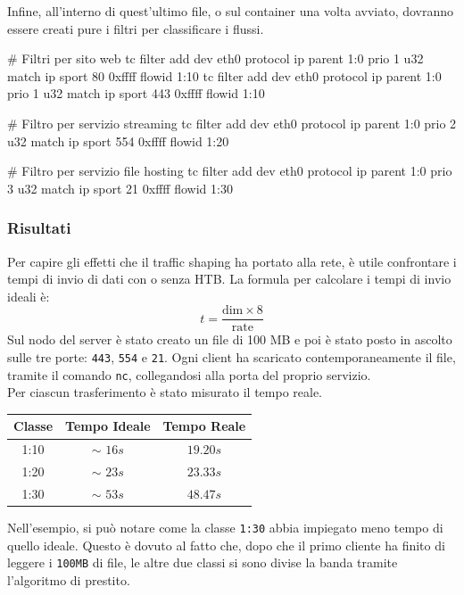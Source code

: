 Infine, all'interno di quest'ultimo file, o sul container una volta avviato, dovranno essere creati pure i filtri per classificare i flussi.
\begin{bash}
  # Filtri per sito web
  tc filter add dev eth0 protocol ip parent 1:0 prio 1 u32 match ip sport 80 0xffff flowid 1:10
  tc filter add dev eth0 protocol ip parent 1:0 prio 1 u32 match ip sport 443 0xffff flowid 1:10

  # Filtro per servizio streaming
  tc filter add dev eth0 protocol ip parent 1:0 prio 2 u32 match ip sport 554 0xffff flowid 1:20

  # Filtro per servizio file hosting
  tc filter add dev eth0 protocol ip parent 1:0 prio 3 u32 match ip sport 21 0xffff flowid 1:30
\end{bash}

\subsubsection{Risultati}
Per capire gli effetti che il traffic shaping ha portato alla rete, è utile confrontare i tempi di invio di dati con o senza HTB. La formula per calcolare i tempi di invio ideali è:
\[
  t = \frac{\text{dim} \times 8}{\text{rate}}
\]
Sul nodo del server è stato creato un file di 100 MB e poi è stato posto in ascolto sulle tre porte: \texttt{443}, \texttt{554} e \texttt{21}. 
Ogni client ha scaricato contemporaneamente il file, tramite il comando \texttt{nc}, collegandosi alla porta del proprio servizio. \\ 
Per ciascun trasferimento è stato misurato il tempo reale.
\begin{center}
  \begin{tabular}{ |c|c|c| }
    \hline
    \textbf{Classe} & \textbf{Tempo Ideale} & \textbf{Tempo Reale} \\
    \hline
    1:10 & $\sim$ $16s$ & $19.20s$ \\
    \hline
    1:20 & $\sim$ $23s$ & $23.33s$ \\
    \hline
    1:30 & $\sim$ $53s$ & $48.47s$ \\
    \hline
  \end{tabular}
\end{center}
Nell'esempio, si può notare come la classe \texttt{1:30} abbia impiegato meno tempo di quello ideale. Questo è dovuto al fatto che,
dopo che il primo cliente ha finito di leggere i \texttt{100MB} di file, le altre due classi si sono divise la banda tramite l'algoritmo di prestito. \\
